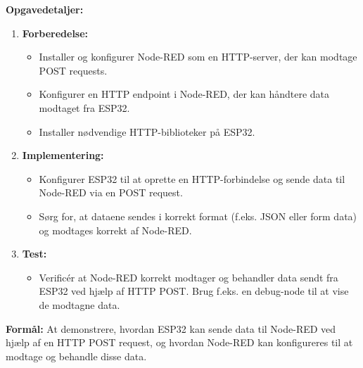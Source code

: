 \documentclass[12pt,a4paper]{book}
\begin{document}
	\textbf{Opgavedetaljer:}
	\begin{enumerate}
		\item \textbf{Forberedelse:}
		\begin{itemize}
			\item Installer og konfigurer Node-RED som en HTTP-server, der kan modtage POST requests.
			\item Konfigurer en HTTP endpoint i Node-RED, der kan håndtere data modtaget fra ESP32.
			\item Installer nødvendige HTTP-biblioteker på ESP32.
		\end{itemize}
		\item \textbf{Implementering:}
		\begin{itemize}
			\item Konfigurer ESP32 til at oprette en HTTP-forbindelse og sende data til Node-RED via en POST request.
			\item Sørg for, at dataene sendes i korrekt format (f.eks. JSON eller form data) og modtages korrekt af Node-RED.
		\end{itemize}
		\item \textbf{Test:}
		\begin{itemize}
			\item Verificér at Node-RED korrekt modtager og behandler data sendt fra ESP32 ved hjælp af HTTP POST. Brug f.eks. en debug-node til at vise de modtagne data.
		\end{itemize}
	\end{enumerate}
	\textbf{Formål:} At demonstrere, hvordan ESP32 kan sende data til Node-RED ved hjælp af en HTTP POST request, og hvordan Node-RED kan konfigureres til at modtage og behandle disse data.
	
\end{document}
